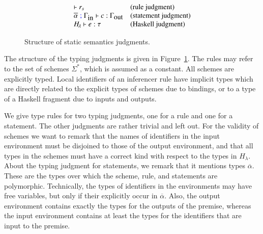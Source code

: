 \documentclass[preprint,natbib]{sigplanconf}
\newcommand\Rule{r}
\newcommand\Statement{c}
\newcommand\Env{\Gamma}
\newcommand\Scheme{\Sigma}
\newcommand\Schemes{\Scheme^*}
\newcommand\SchemeName{s}
\newcommand\Type{\tau}
\newcommand\In{\mbox{in}}
\newcommand\Out{\mbox{out}}
\newcommand\Haskell{H_{\!\lambda}}
\newcommand\attrsep{\;\textcolor{blue}{;}\;}
\begin{document}
    \begin{figure}[htp]
    \begin{displaymath}
    \begin{array}[t]{ll}
      \vdash \Rule_{\SchemeName}                                             & (\mbox{rule judgment}) \\
      \overline{\alpha} \attrsep \Env_{\In} \vdash \Statement : \Env_{\Out}  & (\mbox{statement judgment}) \\
      \Haskell \vdash e : \Type                                              & (\mbox{Haskell judgment}) \\
    \end{array}
    \end{displaymath}
    \caption{Structure of static semantics judgments.}
    \label{fig:static-judgements}
    \end{figure}

  The structure of the typing judgments is given in Figure~\ref{fig:static-judgements}. The rules may refer
  to the set of schemes $\Schemes$, which is assumed as a constant. All schemes are explicitly typed.
  Local identifiers of an inferencer rule have implicit types which are directly related to the explicit types of schemes
  due to bindings, or to a type of a Haskell fragment due to inputs and outputs.
  
  We give type rules for two typing judgments, one for a rule and one for a statement. The other judgments are
  rather trivial and left out. For the validity of schemes we want to remark that the names of identifiers
  in the input environment must be disjoined to those of the output environment, and that all types in the
  schemes must have a correct kind with respect to the types in $\Haskell$.
  About the typing judgment for statements, we remark that it mentions types $\overline{\alpha}$. These are
  the types over which the scheme, rule, and statements are polymorphic. Technically, the types of identifiers
  in the environments may have free variables, but only if their explicitly occur in $\overline{\alpha}$.
  Also, the output environment contains exactly the types for the outputs of the premise, whereas the input
  environment contains at least the types for the identifiers that are input to the premise.
\end{document}
